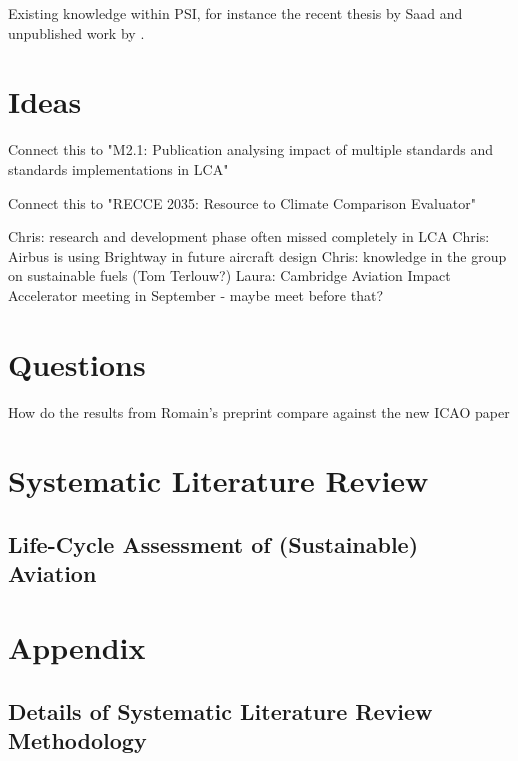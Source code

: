 \documentclass{article}
\begin{document}
    Existing knowledge within PSI, for instance the recent thesis by Saad \cite{saad_synthetic_2022} and unpublished work by \cite{sacchi_climate-neutral_2022}.

\section{Ideas}

    Connect this to "M2.1: Publication analysing impact of multiple standards and standards implementations in LCA"

    Connect this to "RECCE 2035: Resource to Climate Comparison Evaluator"

	Chris: research and development phase often missed completely in LCA
	Chris: Airbus is using Brightway in future aircraft design
	Chris: knowledge in the group on sustainable fuels (Tom Terlouw?)
	Laura: Cambridge Aviation Impact Accelerator meeting in September - maybe meet before that?

\section{Questions}

How do the results from Romain's preprint \cite{sacchi_climate-neutral_2022} compare against the new ICAO paper \cite{prussi_corsia_2021}

\newpage
\section{Systematic Literature Review}

    \subsection{Life-Cycle Assessment of (Sustainable) Aviation}

\newpage
\section{Appendix}


    \subsection{Details of Systematic Literature Review Methodology}
    
\end{document}
